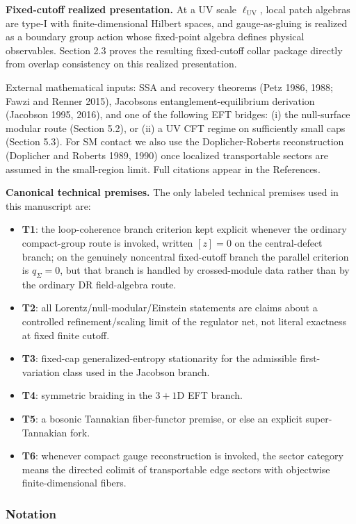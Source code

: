 \textbf{Fixed-cutoff realized presentation.} At a UV scale \(\ell_{\mathrm{UV}}\), local patch algebras are type-I with finite-dimensional Hilbert spaces, and gauge-as-gluing is realized as a boundary group action whose fixed-point algebra defines physical observables. Section 2.3 proves the resulting fixed-cutoff collar package directly from overlap consistency on this realized presentation.

External mathematical inputs: SSA and recovery theorems (Petz 1986, 1988; Fawzi and Renner 2015), Jacobson\textquotesingle s entanglement-equilibrium derivation (Jacobson 1995, 2016), and one of the following EFT bridges: (i) the null-surface modular route (Section 5.2), or (ii) a UV CFT regime on sufficiently small caps (Section 5.3). For SM contact we also use the Doplicher-Roberts reconstruction (Doplicher and Roberts 1989, 1990) once localized transportable sectors are assumed in the small-region limit. Full citations appear in the References.

\textbf{Canonical technical premises.} The only labeled technical premises used in this manuscript are:
\begin{itemize}
\tightlist
\item \textbf{T1}: the loop-coherence branch criterion kept explicit whenever the ordinary compact-group route is invoked, written \([z]=0\) on the central-defect branch; on the genuinely noncentral fixed-cutoff branch the parallel criterion is \(q_\Sigma=0\), but that branch is handled by crossed-module data rather than by the ordinary DR field-algebra route.
\item \textbf{T2}: all Lorentz/null-modular/Einstein statements are claims about a controlled refinement/scaling limit of the regulator net, not literal exactness at fixed finite cutoff.
\item \textbf{T3}: fixed-cap generalized-entropy stationarity for the admissible first-variation class used in the Jacobson branch.
\item \textbf{T4}: symmetric braiding in the \(3+1\)D EFT branch.
\item \textbf{T5}: a bosonic Tannakian fiber-functor premise, or else an explicit super-Tannakian fork.
\item \textbf{T6}: whenever compact gauge reconstruction is invoked, the sector category means the directed colimit of transportable edge sectors with objectwise finite-dimensional fibers.
\end{itemize}

\subsubsection{Notation}\label{15-notation}

